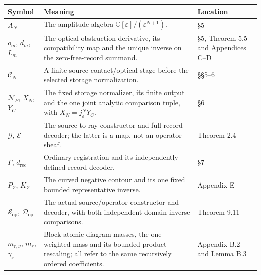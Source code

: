 \documentclass[
  english,
  11pt,
  reqno]{amsart}
\newcounter{none} %
\begin{document}
{\def\LTcaptype{none} %
\begin{longtable}[]{@{}
  >{\raggedright\arraybackslash}p{}
  >{\raggedright\arraybackslash}p{}
  >{\raggedright\arraybackslash}p{}@{}}
\toprule\noalign{}
\begin{minipage}[b]{\linewidth}\raggedright
Symbol
\end{minipage} & \begin{minipage}[b]{\linewidth}\raggedright
Meaning
\end{minipage} & \begin{minipage}[b]{\linewidth}\raggedright
Location
\end{minipage} \\
\midrule\noalign{}
\endhead
\bottomrule\noalign{}
\endlastfoot
\(A_N\) & The amplitude algebra
\(\mathbb C[\varepsilon]/(\varepsilon^{N+1})\). & §5 \\
\(o_m\), \(d_m\), \(L_m\) & The optical obstruction derivative, its
compatibility map and the unique inverse on the zero-free-record
summand. & §5, Theorem 5.5 and Appendices C--D \\
\(\mathcal C_N\) & A finite source contact/optical stage before the
selected storage normalization. & §§5--6 \\
\(\mathcal N_P\), \(X_N\), \(Y_C\) & The fixed storage normalizer, its
finite output and the one joint analytic comparison tuple, with
\(X_N=j_\varepsilon^N Y_C\). & §6 \\
\(\mathcal G\), \(\mathcal E\) & The source-to-ray constructor and
full-record decoder; the latter is a map, not an operator sheaf. &
Theorem 2.4 \\
\(\Gamma\), \(d_{\mathrm{rec}}\) & Ordinary registration and its
independently defined record decoder. & §7 \\
\(P_Z\), \(K_Z\) & The curved negative contour and its one fixed bounded
representative inverse. & Appendix E \\
\(\mathcal S_{\mathrm{op}}\), \(\mathcal D_{\mathrm{op}}\) & The actual
source/operator constructor and decoder, with both independent-domain
inverse comparisons. & Theorem 9.11 \\
\(m_{r,\nu}\), \(m_r\), \(\gamma_r\) & Block atomic diagram masses, the
one weighted mass and its bounded-product rescaling; all refer to the
same recursively ordered coefficients. & Appendix B.2 and Lemma B.3 \\

\end{longtable}}
\end{document}
